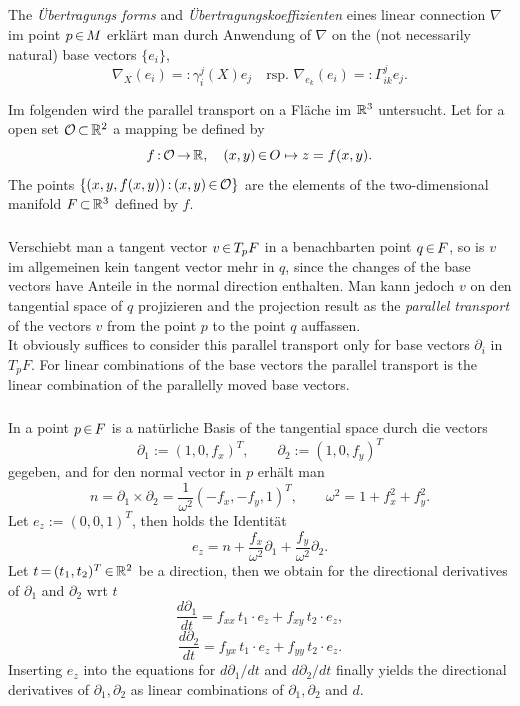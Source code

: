 \documentclass[11pt,twoside]{article}
\begin{document}
\subparagraph{}
The \textit{\"Ubertragungs forms} and \textit{\"Ubertragungskoeffizienten}
eines linear connection $\nabla$ im point $p {\,\in\,} {M}$ erkl\"art man
durch Anwendung of $\nabla$ on the (not necessarily natural)
base vectors $\{e_i\}$,
\[
\nabla_X(e_i) =: \gamma^j_i(X) e_j \quad \mbox{rsp. }
\nabla_{e_k} (e_i) =: \Gamma^j_{ik} e_j.
\]

\begin{example}
Im folgenden wird the parallel transport on a Fl\"ache im ${\mathbb{R}}^3$
untersucht.
Let for a open set $\mathcal{O} {\,\subset\,} {\mathbb{R}}^2$ a mapping be defined by
\[
f{\,:\,} \mathcal{O} {\,\to\,} {\mathbb{R}}, \quad (x,y) {\,\in\,} O \mapsto z = f(x,y).
\]
The points $\{(x,y,f(x,y)) {\,:\,} (x,y) {\,\in\,} \mathcal{O}\}$ are the elements of
the two-dimens\-ional manifold $F {\,\subset\,} {\mathbb{R}}^3$ defined by $f$.

\subparagraph{}
Verschiebt man a tangent vector $v {\,\in\,} T_p F$ in a benachbarten
point $q {\,\in\,} F$,
so is $v$ im allgemeinen kein tangent vector mehr in $q$,
since the changes of the base vectors have Anteile in the normal direction
enthalten.
Man kann jedoch $v$ on den tangential space of $q$ projizieren and the
projection result as the \textit{parallel transport} of the vectors $v$
from the point $p$ to the point $q$ auffassen.\\
It obviously suffices to consider this parallel transport only for base vectors
$\partial_i$ in $T_p F$.
For linear combinations of the base vectors the parallel transport
is the linear combination of the parallelly moved base vectors.

\subparagraph{}
In a point $p {\,\in\,} F$ is a nat\"urliche Basis of the tangential space durch
die vectors
\[
\partial_1 := (1,0,f_x)^T, \qquad \partial_2 := (1,0,f_y)^T
\]
gegeben, and for den normal vector in $p$ erh\"alt man
\[
n = \partial_1 \times \partial_2 = \frac {1}{\omega^2} (-f_x, -f_y, 1)^T,
\qquad
\omega^2 = 1 + f_x^2 + f_y^2.
\]
Let $e_z := (0,0,1)^T$, then holds the Identit\"at
\[
e_z = n + \frac{f_x}{\omega^2} \partial_1 + \frac{f_y}{\omega^2} \partial_2.
\]
Let $t {\,=\,} (t_1,t_2)^T {\,\in\,} {\mathbb{R}}^2$ be a direction,
then we obtain for the directional derivatives of $\partial_1$ and $\partial_2$
{wrt} $t$
\[
\frac {d \partial_1}{dt} = f_{xx} \, t_1 \cdot e_z + f_{xy} \, t_2 \cdot e_z,
\]
\[
\frac {d \partial_2}{dt} = f_{yx} \, t_1 \cdot e_z + f_{yy} \, t_2 \cdot e_z.
\]
Inserting $e_z$ into the equations for $d \partial_1/dt$ and
$d \partial_2/dt$ finally yields the directional derivatives of
$\partial_1, \partial_2$ as linear combinations of $\partial_1, \partial_2$
and $d$.


\end{example}
\end{document}
